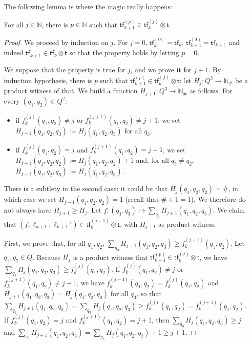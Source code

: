 \documentclass[10pt,a4paper]{article}
\let\mathbb\mathds
\renewcommand{\geq}{\geqslant}
\newcommand{\nats}{\mathbb{N}}
\newcommand{\deff}{:=}
\newcommand*{\states}{Q}
\newcommand*{\abuchistate}{\ell}
\newcommand*{\controlloc}{\abuchistate}
\newcommand*{\dummysymb}{\#}
\newcommand*{\natsanddummy}{\nats_{\dummysymb}}
\newcommand*{\atf}{\mathsf{tf}}
\newcommand*{\tftimes}{\otimes}
\newcommand*{\tftrans}{\mathsf{t}}
\begin{document}
\begin{appendixproof}
	The following lemma is where the magic really happens:

	\begin{lemma}
		\label{there-is-m}
		For all \(j \in \nats\), there is \(p \in \nats\) such that \(\atf_{k+1}^{(p)} \in \atf_k^{(j)} \tftimes \tftrans\).
	\end{lemma}
	\begin{proof}
		We proceed by induction on \(j\).
		For \(j=0\), \(\atf_k^{(0)} = \atf_k\), \(\atf_{k+1}^{(0)} = \atf_{k+1}\) and indeed \(\atf_{k+1} \in \atf_k \tftimes \tftrans\) so that the property holds by letting \(p=0\).

		We suppose that the property is true for \(j\), and we prove it for \(j+1\).
		By induction hypothesis, there is \(p\) such that \(\atf_{k+1}^{(p)} \in \atf_k^{(j)} \tftimes \tftrans\); let \(H_j : \states^3 \to \natsanddummy\) be a product witness of that.
		We build a function \(H_{j+1}: \states^3 \to \natsanddummy\) as follows.
		For every \((q_1,q_2) \in \states^2\):
		\begin{itemize}[noitemsep,topsep=0pt,parsep=0pt,partopsep=0pt]
			\item if \(f_{k}^{(j)}(q_1,q_2) \ne j\) or \(f_{k}^{(j+1)}(q_1,q_2) \ne j+1\), we set \(H_{j+1}(q_1,q_2,q_3) \deff H_j(q_1,q_2,q_3)\) for all \(q_3\);
			\item if \(f_{k}^{(j)}(q_1,q_2)= j\) and \(f_{k}^{(j+1)}(q_1,q_2)= j+1\), we set \(H_{j+1}(q_1,q_2,q_2) \deff H_j(q_1,q_2,q_2) +1\) and, for all \(q_3 \ne q_2\), \(H_{j+1}(q_1,q_2,q_3) \deff H_j(q_1,q_2,q_3)\).
		\end{itemize}
		There is a subtlety in the second case: it could be that \(H_j(q_1,q_2,q_2) = \dummysymb\), in which case we set \(H_{j+1}(q_1,q_2,q_2) = 1\) (recall that \(\dummysymb +1 = 1\)).
		We therefore do not always have \(H_{j+1} \geq H_j\).
		Let \(f: (q_1,q_3) \mapsto \sum_{q_2} H_{j+1}(q_1,q_2,q_3)\).
		We claim that \((f, \controlloc_{k+1}, \controlloc_{k+1}') \in \atf_k^{(j+1)} \tftimes \tftrans\), with \(H_{j+1}\) as product witness.

		First, we prove that, for all \(q_1,q_2\), \(\sum_{q_3} H_{j+1}(q_1,q_2,q_3) \geq f_k^{(j+1)}(q_1,q_2)\).
		Let \(q_1,q_2 \in \states\).
		Because \(H_j\) is a product witness that \(\atf_{k+1}^{(p)} \in \atf_k^{(j)} \tftimes \tftrans\), we have \(\sum_{q_3} H_j(q_1,q_2,q_3) \geq f_{k}^{(j)}(q_1,q_2)\).
		If \(f_{k}^{(j)}(q_1,q_2) \ne j\) or \(f_{k}^{(j+1)}(q_1,q_2) \ne j+1\), we have \(f_k^{(j+1)}(q_1,q_2) = f_k^{(j)}(q_1,q_2)\) and \(H_{j+1}(q_1,q_2,q_3) = H_j(q_1,q_2,q_3)\) for all \(q_3\), so that \(\sum_{q_3} H_{j+1}(q_1,q_2,q_3) = \sum_{q_3} H_{j}(q_1,q_2,q_3) \geq f_k^{(j)}(q_1,q_2) = f_k^{(j+1)}(q_1,q_2)\).
		If \(f_{k}^{(j)}(q_1,q_2) = j\) and \(f_{k}^{(j+1)}(q_1,q_2) = j+1\), then \(\sum_{q_3} H_j(q_1,q_2,q_3) \geq j\) and \(\sum_{q_3} H_{j+1}(q_1,q_2,q_3) = \sum_{q_3} H_j(q_1,q_2,q_3) +1 \geq j+1\).


\end{proof}
\end{appendixproof}
\end{document}
